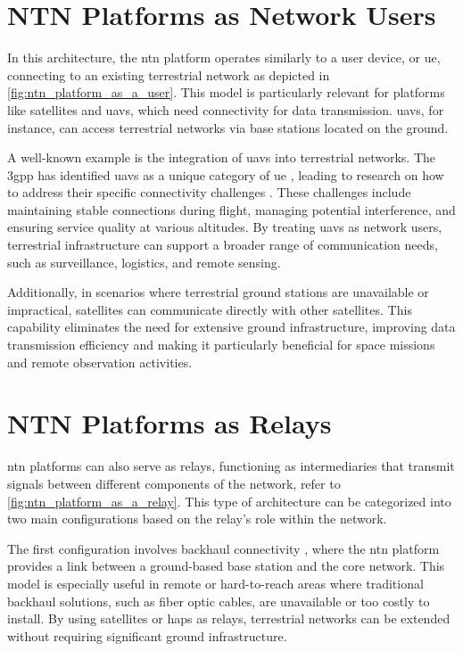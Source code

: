 \section{NTN Platforms as Network Users}\label{sec:ntn_platform_as_a_user}

In this architecture, the \gls{ntn} platform operates similarly to a user device, or \gls{ue}, connecting to an existing terrestrial network as depicted in \cref{fig:ntn_platform_as_a_user}. This model is particularly relevant for platforms like satellites and \glspl{uav}, which need connectivity for data transmission. \glspl{uav}, for instance, can access terrestrial networks via base stations located on the ground.

A well-known example is the integration of \glspl{uav} into terrestrial networks. The \gls{3gpp} has identified \glspl{uav} as a unique category of \gls{ue} \autocite{muruganathan2019overview3gpprelease15study}, leading to research on how to address their specific connectivity challenges \autocite{uav_assisted_networks_challenges}. These challenges include maintaining stable connections during flight, managing potential interference, and ensuring service quality at various altitudes. By treating \glspl{uav} as network users, terrestrial infrastructure can support a broader range of communication needs, such as surveillance, logistics, and remote sensing.

Additionally, in scenarios where terrestrial ground stations are unavailable or impractical, satellites can communicate directly with other satellites. This capability eliminates the need for extensive ground infrastructure, improving data transmission efficiency and making it particularly beneficial for space missions and remote observation activities.

\section{NTN Platforms as Relays}\label{sec:ntn_platform_as_a_relay}

\gls{ntn} platforms can also serve as relays, functioning as intermediaries that transmit signals between different components of the network, refer to \cref{fig:ntn_platform_as_a_relay}. This type of architecture can be categorized into two main configurations based on the relay's role within the network.

The first configuration involves backhaul connectivity \autocite{Elamassie2023FreeSO}, where the \gls{ntn} platform provides a link between a ground-based base station and the core network. This model is especially useful in remote or hard-to-reach areas where traditional backhaul solutions, such as fiber optic cables, are unavailable or too costly to install. By using satellites or \glspl{hap} as relays, terrestrial networks can be extended without requiring significant ground infrastructure.

